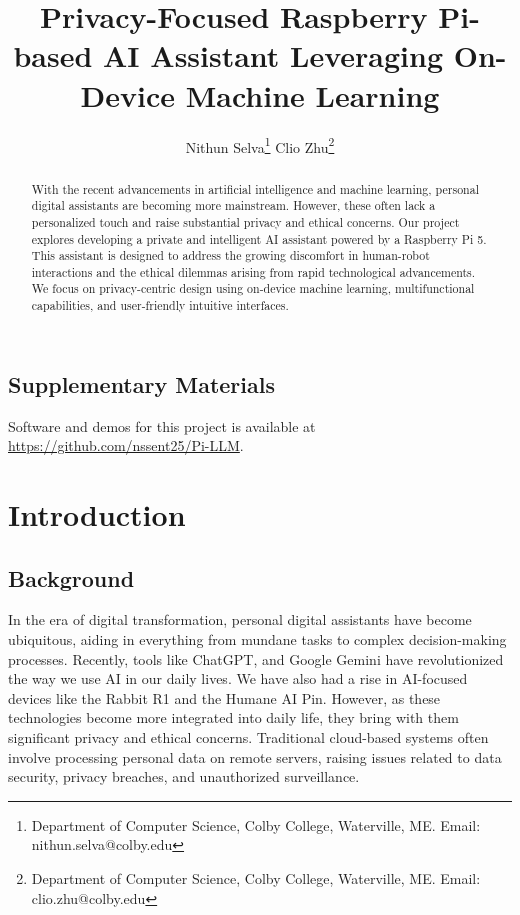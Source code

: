 \documentclass[12pt]{article}
\begin{document}
\thispagestyle{empty}

\author{Nithun Selva\thanks{Department of Computer Science, Colby College, Waterville, ME. Email: nithun.selva@colby.edu} \quad {}Clio Zhu\thanks{Department of Computer Science, Colby College, Waterville, ME. Email: clio.zhu@colby.edu}}

\title{\bf Privacy-Focused Raspberry Pi-based AI Assistant Leveraging On-Device Machine Learning}

\date{}
\maketitle

\begin{abstract}
	With the recent advancements in artificial intelligence and machine learning, personal digital assistants are becoming more mainstream. However, these often lack a personalized touch and raise substantial privacy and ethical concerns. Our project explores developing a private and intelligent AI assistant powered by a Raspberry Pi 5. This assistant is designed to address the growing discomfort in human-robot interactions and the ethical dilemmas arising from rapid technological advancements. We focus on privacy-centric design using on-device machine learning, multifunctional capabilities, and user-friendly intuitive interfaces.
\end{abstract}

\subsection*{Supplementary Materials}
Software and demos for this project is available at \href{https://github.com/nssent25/Pi-LLM}{https://github.com/nssent25/Pi-LLM}.


\section{Introduction}
\subsection{Background}
In the era of digital transformation, personal digital assistants have become ubiquitous, aiding in everything from mundane tasks to complex decision-making processes. Recently, tools like ChatGPT, and Google Gemini have revolutionized the way we use AI in our daily lives. We have also had a rise in AI-focused devices like the Rabbit R1 and the Humane AI Pin. However, as these technologies become more integrated into daily life, they bring with them significant privacy and ethical concerns. Traditional cloud-based systems often involve processing personal data on remote servers, raising issues related to data security, privacy breaches, and unauthorized surveillance.
\end{document}
